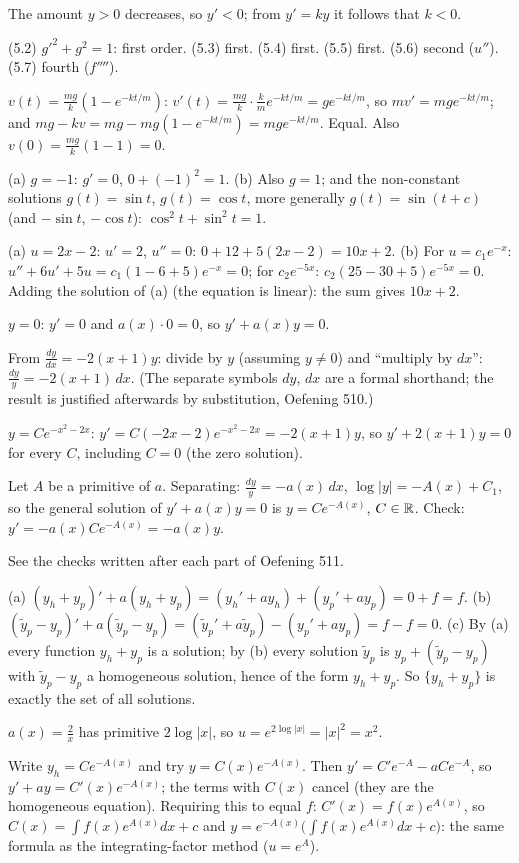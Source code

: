  The amount $y>0$ decreases, so $y'<0$; from $y'=ky$ it follows that $k<0$.

 (5.2) $g'^2+g^2=1$: first order. (5.3) first. (5.4) first. (5.5) first. (5.6) second ($u''$). (5.7) fourth ($f''''$).

 $v(t)=\frac{mg}k(1-e^{-kt/m})$: $v'(t)=\frac{mg}k\cdot\frac km e^{-kt/m}=ge^{-kt/m}$, so $mv'=mge^{-kt/m}$; and $mg-kv=mg-mg(1-e^{-kt/m})=mge^{-kt/m}$. Equal. Also $v(0)=\frac{mg}k(1-1)=0$.

 (a) $g=-1$: $g'=0$, $0+(-1)^2=1$. (b) Also $g=1$; and the non-constant solutions $g(t)=\sin t$, $g(t)=\cos t$, more generally $g(t)=\sin(t+c)$ (and $-\sin t$, $-\cos t$): $\cos^2t+\sin^2t=1$.

 (a) $u=2x-2$: $u'=2$, $u''=0$: $0+12+5(2x-2)=10x+2$. (b) For $u=c_1e^{-x}$: $u''+6u'+5u=c_1(1-6+5)e^{-x}=0$; for $c_2e^{-5x}$: $c_2(25-30+5)e^{-5x}=0$. Adding the solution of (a) (the equation is linear): the sum gives $10x+2$.

 $y=0$: $y'=0$ and $a(x)\cdot0=0$, so $y'+a(x)y=0$.

 From $\frac{dy}{dx}=-2(x+1)y$: divide by $y$ (assuming $y\ne0$) and ``multiply by $dx$'': $\frac{dy}y=-2(x+1)\,dx$. (The separate symbols $dy$, $dx$ are a formal shorthand; the result is justified afterwards by substitution, Oefening 510.)

 $y=Ce^{-x^2-2x}$: $y'=C(-2x-2)e^{-x^2-2x}=-2(x+1)y$, so $y'+2(x+1)y=0$ for every $C$, including $C=0$ (the zero solution).

 Let $A$ be a primitive of $a$. Separating: $\frac{dy}y=-a(x)\,dx$, $\log|y|=-A(x)+C_1$, so the general solution of $y'+a(x)y=0$ is $y=Ce^{-A(x)}$, $C\in\mathbb{R}$. Check: $y'=-a(x)Ce^{-A(x)}=-a(x)y$.

 See the checks written after each part of Oefening 511.

 (a) $(y_h+y_p)'+a(y_h+y_p)=(y_h'+ay_h)+(y_p'+ay_p)=0+f=f$. (b) $(\tilde y_p-y_p)'+a(\tilde y_p-y_p)=(\tilde y_p'+a\tilde y_p)-(y_p'+ay_p)=f-f=0$. (c) By (a) every function $y_h+y_p$ is a solution; by (b) every solution $\tilde y_p$ is $y_p+(\tilde y_p-y_p)$ with $\tilde y_p-y_p$ a homogeneous solution, hence of the form $y_h+y_p$. So $\{y_h+y_p\}$ is exactly the set of all solutions.

 $a(x)=\frac2x$ has primitive $2\log|x|$, so $u=e^{2\log|x|}=|x|^2=x^2$.

 Write $y_h=Ce^{-A(x)}$ and try $y=C(x)e^{-A(x)}$. Then $y'=C'e^{-A}-aCe^{-A}$, so $y'+ay=C'(x)e^{-A(x)}$; the terms with $C(x)$ cancel (they are the homogeneous equation). Requiring this to equal $f$: $C'(x)=f(x)e^{A(x)}$, so $C(x)=\int f(x)e^{A(x)}dx+c$ and $y=e^{-A(x)}\Big(\int f(x)e^{A(x)}dx+c\Big)$: the same formula as the integrating-factor method ($u=e^{A}$).

